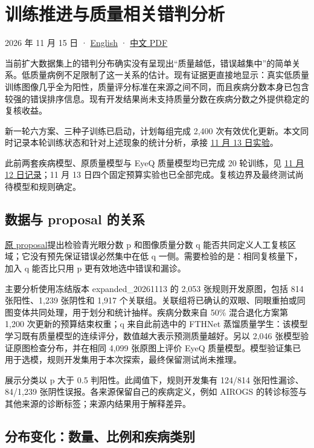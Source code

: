 \documentclass[
  10pt,
]{article}
\author{}
\date{}
\begin{document}
\section{训练推进与质量相关错判分析}\label{ux8badux7ec3ux63a8ux8fdbux4e0eux8d28ux91cfux76f8ux5173ux9519ux5224ux5206ux6790}

2026 年 11 月 15 日 · \href{quality-and-training.en.md}{English} ·
\href{quality-and-training.zh.pdf}{中文 PDF}

当前扩大数据集上的错判分布确实没有呈现出``质量越低，错误越集中''的简单关系。低质量病例不足限制了这一关系的估计。现有证据更直接地显示：真实低质量训练图像几乎全为阳性，质量评分标准在来源之间不同，而且疾病分数本身已包含较强的错误排序信息。现有开发结果尚未支持质量分数在疾病分数之外提供稳定的复核收益。

新一轮六方案、三种子训练已启动，计划每组完成 2,400
次有效优化更新。本文同时记录本轮训练状态和针对上述现象的统计分析，承接
\href{../2026-11-13/README.md}{11 月 13 日实验}。

此前两套疾病模型、原质量模型与 EyeQ 质量模型均已完成 20 轮训练，见
\href{../2026-11-12/训练进展报告.md}{11 月 12 日记录}；11 月 13
日四个固定预算实验也已全部完成。复核边界及最终测试尚待模型和规则确定。

\subsection{数据与 proposal
的关系}\label{ux6570ux636eux4e0e-proposal-ux7684ux5173ux7cfb}

\href{../../../proposal-1106.pdf}{原 proposal}提出检验青光眼分数 p
和图像质量分数 q
能否共同定义人工复核区域；它没有预先保证错误必然集中在低 q
一侧。需要检验的是：相同复核量下，加入 q 能否比只用 p
更有效地选中错误和漏诊。

主要分析使用冻结版本 expanded\_20261113 的 2,053 张规则开发原图，包括
814 张阳性、1,239 张阴性和 1,917
个关联组。关联组将已确认的双眼、同眼重拍或同图变体共同处理，用于划分和统计抽样。疾病分数来自
50\% 混合退化方案第 1,200 次更新的预算结束权重；q 来自此前选中的 FTHNet
蒸馏质量学生：该模型学习既有质量模型的连续评分，数值越大表示预测质量越好。另以
2,046 张模型验证原图检查分布，并在相同 4,099 张原图上评价 EyeQ
质量模型。模型验证集已用于选模，规则开发集用于本次探索，最终保留测试尚未推理。

展示分类以 p 大于 0.5 判阳性。此阈值下，规则开发集有 124/814
张阳性漏诊、84/1,239 张阴性误报。各来源保留自己的疾病定义，例如 AIROGS
的转诊标签与其他来源的诊断标签；来源内结果用于解释差异。

\subsection{分布变化：数量、比例和疾病类别}\label{ux5206ux5e03ux53d8ux5316ux6570ux91cfux6bd4ux4f8bux548cux75beux75c5ux7c7bux522b}
\end{document}
